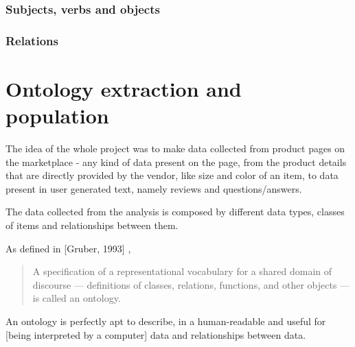 \documentclass[LaM,binding=0.6cm]{sapthesis}
\begin{document}
\subsection{Subjects, verbs and objects}

\subsection{Relations}

\chapter{Ontology extraction and population}

The idea of the whole project was to make data collected from product pages on the marketplace - any kind of data present on the page, from the product details that are directly provided by the vendor, like size and color of an item, to data present in user generated text, namely reviews and questions/answers.

The data collected from the analysis is composed by different data types, classes of items and relationships between them.

As defined in [Gruber, 1993] \cite{gruber_translation_1993}, 
\begin{quote}
A specification of a representational vocabulary for a shared domain of discourse — definitions of classes, relations, functions, and other objects — is called an ontology. 
\end{quote}

An ontology is perfectly apt to describe, in a human-readable and useful for [being interpreted by a computer] data and relationships between data.
\end{document}
